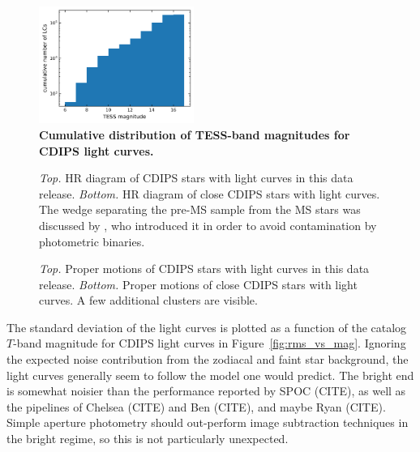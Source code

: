 \documentclass[12pt,twocolumn,tighten]{aastex62}
\begin{document}
\begin{figure}[t]
	\begin{center}
		\leavevmode
		\includegraphics[width=0.45\textwidth]{cdf_T_mag.png}
	\end{center}
	\vspace{-0.5cm}
	\caption{
    {\bf Cumulative distribution of TESS-band magnitudes for CDIPS
    light curves.}
		\label{fig:cdf_T_mag}
	}
\end{figure}

\begin{figure}[!ht]
	\vspace{-0.8cm}
	\caption{
    {\it Top.} HR diagram of CDIPS stars with light curves in this
    data release.  {\it Bottom.} HR diagram of close CDIPS stars with
    light curves. The wedge separating the pre-MS sample from the MS
    stars was discussed by \citet{zari_3d_2018}, who introduced it in
    order to avoid contamination by photometric binaries.
	}
	\label{fig:hrd}
\end{figure}

\begin{figure}[!ht]
	\vspace{-0.8cm}
	\caption{
    {\it Top.} Proper motions of CDIPS stars with light curves in this
    data release.  {\it Bottom.} Proper motions of close CDIPS stars
    with light curves. A few additional clusters are visible.
	}
	\label{fig:propermotions}
\end{figure}


The standard deviation of the light curves is plotted as a function of the 
catalog $T$-band magnitude for CDIPS light curves in 
Figure~\ref{fig:rms_vs_mag}.
Ignoring the expected noise contribution from the zodiacal and faint star 
background, the light curves generally seem to follow the model one would 
predict.
The bright end is somewhat noisier than the performance reported by SPOC 
(CITE), as well as the pipelines of 
Chelsea (CITE) and Ben (CITE), and maybe Ryan (CITE).
Simple aperture photometry should out-perform image subtraction techniques in 
the bright regime, so this is not particularly unexpected.
\end{document}
